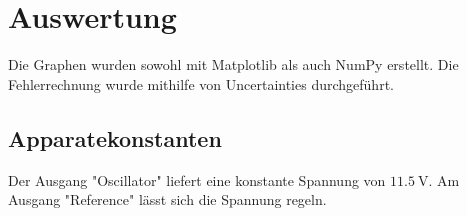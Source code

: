 \section{Auswertung}
\label{sec:Auswertung}


Die Graphen wurden sowohl mit Matplotlib \cite{matplotlib} als auch NumPy \cite{numpy} erstellt. Die Fehlerrechnung wurde mithilfe von Uncertainties \cite{uncertainties} durchgeführt.

\subsection{Apparatekonstanten}
\label{sec:Apparatekonstanten}
Der Ausgang "Oscillator" liefert eine konstante Spannung von $\SI{11,5}{\volt}$.
Am Ausgang "Reference" lässt sich die Spannung regeln.

